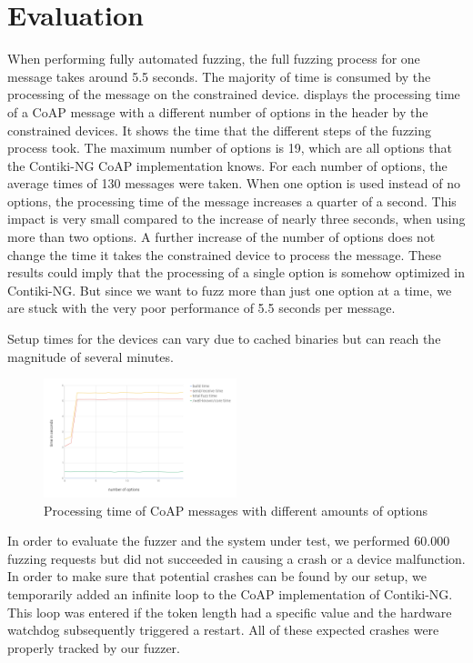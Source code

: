 \section{Evaluation}
\label{section:evaluation}


When performing fully automated fuzzing, the full fuzzing process for one message takes around 5.5 seconds. The majority of time is consumed by the processing of the message on the constrained device.  displays the processing time of a CoAP message with a different number of options in the header by the constrained devices. It shows the time that the different steps of the fuzzing process took. The maximum number of options is 19, which are all options that the Contiki-NG CoAP implementation knows. For each number of options, the average times of 130 messages were taken. When one option is used instead of no options, the processing time of the message increases a quarter of a second. This impact is very small compared to the increase of nearly three seconds, when using more than two options. A further increase of the number of options does not change the time it takes the constrained device to process the message. These results could imply that the processing of a single option is somehow optimized in Contiki-NG. But since we want to fuzz more than just one option at a time, we are stuck with the very poor performance of 5.5 seconds per message.

Setup times for the devices can vary due to cached binaries but can reach the magnitude of several minutes.

\begin{figure}[h]
	\centering
	\includegraphics[width=0.5\textwidth]{images/fuzzing_performance}
	\caption{Processing time of CoAP messages with different amounts of options}
	\label{figure:fuzzing_performance}
\end{figure}

In order to evaluate the fuzzer and the system under test, we performed 60.000 fuzzing requests but did not succeeded in causing a crash or a device malfunction. In order to make sure that potential crashes can be found by our setup, we temporarily added an infinite loop to the CoAP implementation of Contiki-NG. This loop was entered if the token length had a specific value and the hardware watchdog subsequently triggered a restart. All of these expected crashes were properly tracked by our fuzzer.